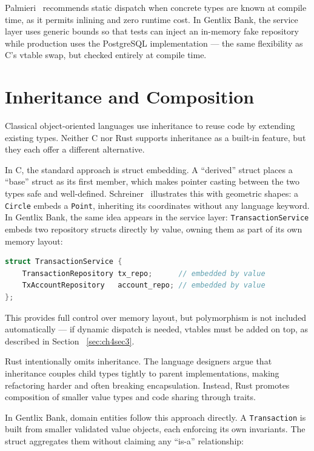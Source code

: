 Palmieri~\cite{Palmieri2022} recommends static dispatch when concrete types
are known at compile time, as it permits inlining and zero runtime cost.
In Gentlix Bank, the service layer uses generic bounds so that tests can
inject an in-memory fake repository while production uses the PostgreSQL
implementation --- the same flexibility as C's vtable swap, but checked
entirely at compile time.

\section{Inheritance and Composition}
\label{sec:ch4sec4}

Classical object-oriented languages use inheritance to reuse code by
extending existing types. Neither C nor Rust supports inheritance as a
built-in feature, but they each offer a different alternative.

In C, the standard approach is struct embedding. A ``derived'' struct places
a ``base'' struct as its first member, which makes pointer casting between
the two types safe and well-defined. Schreiner~\cite{Schreiner1993} illustrates
this with geometric shapes: a \texttt{Circle} embeds a \texttt{Point},
inheriting its coordinates without any language keyword. In Gentlix Bank,
the same idea appears in the service layer: \texttt{TransactionService}
embeds two repository structs directly by value, owning them as part of
its own memory layout:

\begin{lstlisting}[language=C, caption={transaction\_service.c ---
Composition through embedding. The service owns both repository structs
by value; no pointer indirection is needed to access their fields.}]
struct TransactionService {
    TransactionRepository tx_repo;      // embedded by value
    TxAccountRepository   account_repo; // embedded by value 
};
\end{lstlisting}

This provides full control over memory layout, but polymorphism is not included 
automatically — if dynamic dispatch is needed, vtables must be added on top, 
as described in Section ~\ref{sec:ch4sec3}.

Rust intentionally omits inheritance. The language designers argue that
inheritance couples child types tightly to parent implementations, making
refactoring harder and often breaking encapsulation. Instead, Rust promotes
composition of smaller value types and code sharing through traits.

In Gentlix Bank, domain entities follow this approach directly. A
\texttt{Transaction} is built from smaller validated value objects, each
enforcing its own invariants. The struct aggregates them without claiming
any ``is-a'' relationship:


